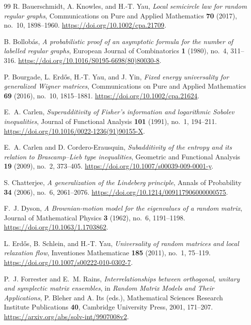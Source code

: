 \begin{thebibliography}{99}
R. Bauerschmidt, A. Knowles, and H.-T. Yau,
\emph{Local semicircle law for random regular graphs},
Communications on Pure and Applied Mathematics \textbf{70} (2017), no.~10, 1898--1960.
\url{https://doi.org/10.1002/cpa.21709}.

B. Bollob\'as,
\emph{A probabilistic proof of an asymptotic formula for the number of labelled regular graphs},
European Journal of Combinatorics \textbf{1} (1980), no.~4, 311--316.
\url{https://doi.org/10.1016/S0195-6698(80)80030-8}.

P. Bourgade, L. Erd\H{o}s, H.-T. Yau, and J. Yin,
\emph{Fixed energy universality for generalized Wigner matrices},
Communications on Pure and Applied Mathematics \textbf{69} (2016), no.~10, 1815--1881.
\url{https://doi.org/10.1002/cpa.21624}.

E.~A. Carlen,
\emph{Superadditivity of Fisher's information and logarithmic Sobolev inequalities},
Journal of Functional Analysis \textbf{101} (1991), no.~1, 194--211.
\url{https://doi.org/10.1016/0022-1236(91)90155-X}.

E.~A. Carlen and D. Cordero-Erausquin,
\emph{Subadditivity of the entropy and its relation to Brascamp--Lieb type inequalities},
Geometric and Functional Analysis \textbf{19} (2009), no.~2, 373--405.
\url{https://doi.org/10.1007/s00039-009-0001-y}.

S. Chatterjee,
\emph{A generalization of the Lindeberg principle},
Annals of Probability \textbf{34} (2006), no.~6, 2061--2076.
\url{https://doi.org/10.1214/009117906000000575}.

F.~J. Dyson,
\emph{A Brownian-motion model for the eigenvalues of a random matrix},
Journal of Mathematical Physics \textbf{3} (1962), no.~6, 1191--1198.
\url{https://doi.org/10.1063/1.1703862}.

L. Erd\H{o}s, B. Schlein, and H.-T. Yau,
\emph{Universality of random matrices and local relaxation flow},
Inventiones Mathematicae \textbf{185} (2011), no.~1, 75--119.
\url{https://doi.org/10.1007/s00222-010-0302-7}.

P.~J. Forrester and E.~M. Rains,
\emph{Interrelationships between orthogonal, unitary and symplectic matrix ensembles},
in \emph{Random Matrix Models and Their Applications},
P. Bleher and A. Its (eds.), Mathematical Sciences Research Institute
Publications \textbf{40}, Cambridge University Press, 2001, 171--207.
\url{https://arxiv.org/abs/solv-int/9907008v2}.


\end{thebibliography}
